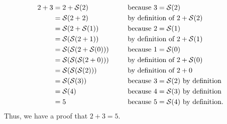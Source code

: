 \begin{example}[$2 + 3 = 5$]
    ~\vspace{-\baselineskip}
    \begin{alignat*}{2}
        2 + 3 &= 2 + \successor{2} &&\text{ because } 3 = \successor{2}\\
              &= \successor{2 + 2} &&\text{ by definition of } 2 + \successor{2}\\
              &= \successor{2 + \successor{1}} &&\text{ because } 2 = \successor{1}\\
              &= \successor{\successor{2 + 1}} &&\text{ by definition of } 2 + \successor{1}\\
              &= \successor{\successor{2 + \successor{0}}} &&\text{ because } 1 = \successor{0}\\
              &= \successor{\successor{\successor{2 + 0}}}~~~~&&\text{ by definition of } 2 + \successor{0}\\
              &= \successor{\successor{\successor{2}}} &&\text{ by definition of } 2 + 0\\
              &= \successor{\successor{3}} &&\text{ because } 3 = \successor{2} \text{ by definition}\\
              &= \successor{4} &&\text{ because } 4 = \successor{3} \text{ by definition}\\
              &= 5 &&\text{ because } 5 = \successor{4} \text{ by definition}.
    \end{alignat*}
    Thus, we have a proof that $2 + 3 = 5$.
\end{example}
